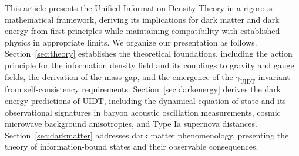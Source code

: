 This article presents the Unified Information-Density Theory in a rigorous mathematical framework, deriving its implications for dark matter and dark energy from first principles while maintaining compatibility with established physics in appropriate limits. We organize our presentation as follows. Section~\ref{sec:theory} establishes the theoretical foundations, including the action principle for the information density field and its couplings to gravity and gauge fields, the derivation of the mass gap, and the emergence of the $\gamma_{\mathrm{UIDT}}$ invariant from self-consistency requirements. Section~\ref{sec:darkenergy} derives the dark energy predictions of UIDT, including the dynamical equation of state and its observational signatures in baryon acoustic oscillation measurements, cosmic microwave background anisotropies, and Type Ia supernova distances. Section~\ref{sec:darkmatter} addresses dark matter phenomenology, presenting the theory of information-bound states and their observable consequences.